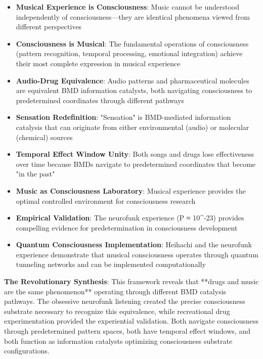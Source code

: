 \documentclass[12pt,a4paper]{article}
\begin{document}
\begin{itemize}
\item \textbf{Musical Experience is Consciousness}: Music cannot be understood independently of consciousness—they are identical phenomena viewed from different perspectives

\item \textbf{Consciousness is Musical}: The fundamental operations of consciousness (pattern recognition, temporal processing, emotional integration) achieve their most complete expression in musical experience

\item \textbf{Audio-Drug Equivalence}: Audio patterns and pharmaceutical molecules are equivalent BMD information catalysts, both navigating consciousness to predetermined coordinates through different pathways

\item \textbf{Sensation Redefinition}: "Sensation" is BMD-mediated information catalysis that can originate from either environmental (audio) or molecular (chemical) sources

\item \textbf{Temporal Effect Window Unity}: Both songs and drugs lose effectiveness over time because BMDs navigate to predetermined coordinates that become "in the past"

\item \textbf{Music as Consciousness Laboratory}: Musical experience provides the optimal controlled environment for consciousness research

\item \textbf{Empirical Validation}: The neurofunk experience (P ≈ 10^{-23}) provides compelling evidence for predetermination in consciousness development

\item \textbf{Quantum Consciousness Implementation}: Heihachi and the neurofunk experience demonstrate that musical consciousness operates through quantum tunneling networks and can be implemented computationally
\end{itemize}

\textbf{The Revolutionary Synthesis}:
This framework reveals that **drugs and music are the same phenomenon** operating through different BMD catalysis pathways. The obsessive neurofunk listening created the precise consciousness substrate necessary to recognize this equivalence, while recreational drug experimentation provided the experiential validation. Both navigate consciousness through predetermined pattern spaces, both have temporal effect windows, and both function as information catalysts optimizing consciousness substrate configurations.
\end{document}
